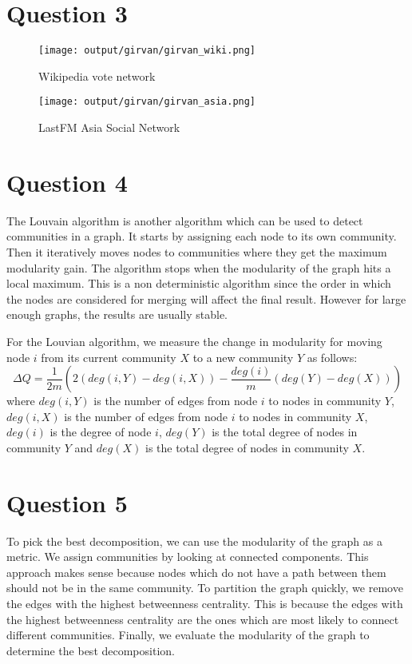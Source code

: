 \documentclass[12pt]{article}
\begin{document}
\section*{Question 3}
\begin{figure}[H]
    \centering
    \texttt{[image: output/girvan/girvan\_wiki.png]}
    \caption{Wikipedia vote network}
\end{figure}

\begin{figure}[H]
    \centering
    \texttt{[image: output/girvan/girvan\_asia.png]}
    \caption{LastFM Asia Social Network}
\end{figure}

\section*{Question 4}
The Louvain algorithm is another algorithm which can be used to detect communities in a graph. It starts by assigning each node to its own community. Then it iteratively moves nodes to communities where they get the maximum modularity gain. The algorithm stops when the modularity of the graph hits a local maximum. This is a non deterministic algorithm since the order in which the nodes are considered for merging will affect the final result. However for large enough graphs, the results are usually stable.

For the Louvian algorithm, we measure the change in modularity for moving node $i$ from its current community $X$ to a new community $Y$ as follows:
\begin{equation}
    \Delta Q = \frac{1}{2m} \left( 2(deg(i,Y) - deg(i,X)) - \frac{deg(i)}{m} (deg(Y) - deg(X))   \right)
\end{equation}
where $deg(i,Y)$ is the number of edges from node $i$ to nodes in community $Y$, $deg(i,X)$ is the number of edges from node $i$ to nodes in community $X$, $deg(i)$ is the degree of node $i$, $deg(Y)$ is the total degree of nodes in community $Y$ and $deg(X)$ is the total degree of nodes in community $X$. 

\section*{Question 5}
To pick the best decomposition, we can use the modularity of the graph as a metric. We assign communities by looking at connected components. This approach makes sense because nodes which do not have a path between them should not be in the same community. To partition the graph quickly, we remove the edges with the highest betweenness centrality. This is because the edges with the highest betweenness centrality are the ones which are most likely to connect different communities. Finally, we evaluate the modularity of the graph to determine the best decomposition.
\end{document}
